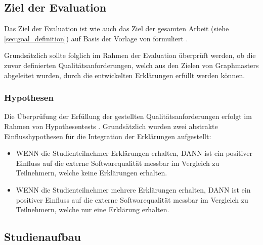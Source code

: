 \subsection{Ziel der Evaluation}

Das Ziel der Evaluation ist wie auch das Ziel der gesamten Arbeit (siehe \autoref{sec:goal_definition}) auf Basis der Vorlage von \citeauthor{wohlin2012experimentation} formuliert \cite{wohlin2012experimentation}.

\smallskip

\noindent{}

\smallskip

Grundsätzlich sollte folglich im Rahmen der Evaluation überprüft werden, ob die zuvor definierten Qualitätsanforderungen, welch aus den Zielen von Graphmasters abgeleitet wurden, durch die entwickelten Erklärungen erfüllt werden können.

\subsubsection{Hypothesen}
\label{sec:evaluation_hypothesis}

Die Überprüfung der Erfüllung der gestellten Qualitätsanforderungen erfolgt im Rahmen von Hypothesentests \cite{wohlin2012experimentation}. Grundsätzlich wurden zwei abstrakte Einflusshypothesen für die Integration der Erklärungen aufgestellt:

\begin{itemize}
    \item WENN die Studienteilnehmer Erklärungen erhalten, DANN ist ein positiver Einfluss auf die externe Softwarequalität messbar im Vergleich zu Teilnehmern, welche keine Erklärungen erhalten.
    \item WENN die Studienteilnehmer mehrere Erklärungen erhalten, DANN ist ein positiver Einfluss auf die externe Softwarequalität messbar im Vergleich zu Teilnehmern, welche nur eine Erklärung erhalten.
\end{itemize}

\subsection{Studienaufbau}

